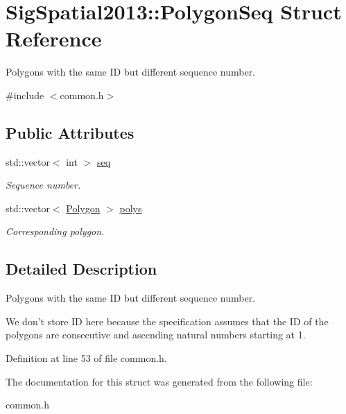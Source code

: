 \hypertarget{structSigSpatial2013_1_1PolygonSeq}{\section{Sig\-Spatial2013\-:\-:Polygon\-Seq Struct Reference}
\label{structSigSpatial2013_1_1PolygonSeq}
}


Polygons with the same I\-D but different sequence number.  




{\ttfamily \#include $<$common.\-h$>$}

\subsection*{Public Attributes}
\begin{DoxyCompactItemize}
\item 
\hypertarget{structSigSpatial2013_1_1PolygonSeq_a8e5886e2fe69a1a7078ee74bccae89c9}{std\-::vector$<$ int $>$ \hyperlink{structSigSpatial2013_1_1PolygonSeq_a8e5886e2fe69a1a7078ee74bccae89c9}{seq}}\label{structSigSpatial2013_1_1PolygonSeq_a8e5886e2fe69a1a7078ee74bccae89c9}

\begin{DoxyCompactList}\small\item\em Sequence number. \end{DoxyCompactList}\item 
\hypertarget{structSigSpatial2013_1_1PolygonSeq_aeba1c2ff52d1f1287f5ad1995bfba151}{std\-::vector$<$ \hyperlink{structSigSpatial2013_1_1Polygon}{Polygon} $>$ \hyperlink{structSigSpatial2013_1_1PolygonSeq_aeba1c2ff52d1f1287f5ad1995bfba151}{polys}}\label{structSigSpatial2013_1_1PolygonSeq_aeba1c2ff52d1f1287f5ad1995bfba151}

\begin{DoxyCompactList}\small\item\em Corresponding polygon. \end{DoxyCompactList}\end{DoxyCompactItemize}


\subsection{Detailed Description}
Polygons with the same I\-D but different sequence number. 

We don't store I\-D here because the specification assumes that the I\-D of the polygons are consecutive and ascending natural numbers starting at 1. 

Definition at line 53 of file common.\-h.



The documentation for this struct was generated from the following file\-:\begin{DoxyCompactItemize}
\item 
common.\-h\end{DoxyCompactItemize}
